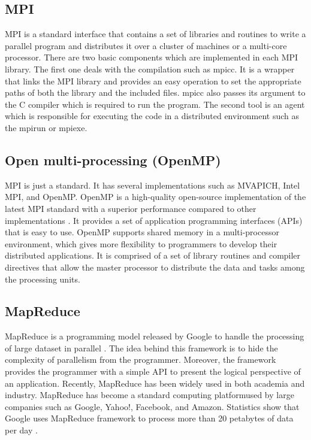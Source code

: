 \documentclass[12pt,a4paper]{report}
\begin{document}
\subsection{MPI}
MPI is a standard interface that contains a set of libraries
and routines to write a parallel program and distributes
it over a cluster of machines or a multi-core processor.
There are two basic components which are implemented
in each MPI library. The first one deals with the compilation
such as mpicc. It is a wrapper that links the
MPI library and provides an easy operation to set the
appropriate paths of both the library and the included
files. mpicc also passes its argument to the C compiler
which is required to run the program. The second tool is
an agent which is responsible for executing the code in a
distributed environment such as the mpirun or mpiexe.
\subsection{Open multi-processing (OpenMP)}
MPI is just a standard. It has several implementations such
as MVAPICH, Intel MPI, and OpenMP. OpenMP  is
a high-quality open-source implementation of the latest
MPI standard with a superior performance compared to
other implementations . It provides a set of application
programming interfaces (APIs) that is easy to use.
OpenMP supports shared memory in a multi-processor
environment, which gives more flexibility to programmers
to develop their distributed applications. It is comprised
of a set of library routines and compiler directives that
allow the master processor to distribute the data and tasks
among the processing units.
\subsection{MapReduce}
MapReduce is a programming model released by Google
to handle the processing of large dataset in parallel .
The idea behind this framework is to hide the complexity
of parallelism from the programmer. Moreover, the
framework provides the programmer with a simple API to
present the logical perspective of an application.
Recently, MapReduce has been widely used in both
academia and industry. MapReduce has become a standard
computing platformused by large companies such as
Google, Yahoo!, Facebook, and Amazon. Statistics show
that Google uses MapReduce framework to process more
than 20 petabytes of data per day .
\end{document}
